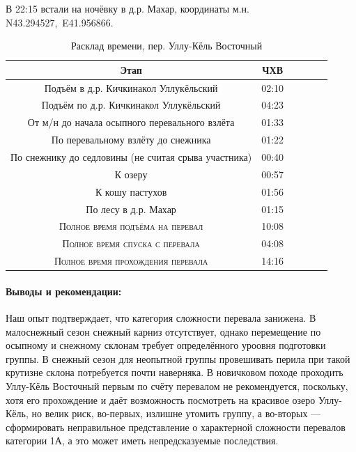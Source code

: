 В 22:15 встали на ночёвку в д.р. Махар, координаты м.н. N43.294527\degree,~E41.956866\degree.

\clearpage 

\begin{table}[h!]
	\centering
	\begin{tabular}{|c|c|c|c|c|c|} 
		\hline 
		Этап & ЧХВ \\ 	
		\hline 
		Подъём в д.р. Кичкинакол Уллукёльский  & 02:10 \\
		Подъём по д.р. Кичкинакол Уллукёльский  & 04:23 \\
		От м/н до начала осыпного перевального взлёта & 01:33\\ 
		По перевальному взлёту до снежника & 01:22\\ 
		По снежнику до седловины (не считая срыва участника) & 00:40\\ 
		К озеру & 00:57 \\
		К кошу пастухов & 01:56 \\
		По лесу в д.р. Махар & 01:15 \\
		\hline
		\textsc{Полное время подъёма на перевал  }& 10:08\\
		\textsc{Полное время спуска с перевала }& 04:08 \\
	\textsc{	Полное время прохождения перевала }& 14:16 \\
		\hline
	\end{tabular}
	\caption{Расклад времени, пер. Уллу-Кёль Восточный}
\end{table}

\paragraph{Выводы и рекомендации:} Наш опыт подтверждает, что категория сложности перевала занижена. В малоснежный сезон снежный карниз отсутствует, однако перемещение по осыпному и снежному склонам требует определённого уроовня подготовки группы. В снежный сезон для неопытной группы провешивать перила при такой крутизне склона потребуется почти наверняка. В новичковом походе проходить Уллу-Кёль Восточный первым по счёту перевалом не рекомендуется, поскольку, хотя его прохождение и даёт возможность посмотреть на красивое озеро Уллу-Кёль, но велик риск, во-первых, излишне утомить группу, а во-вторых --- сформировать неправильное представление о характерной сложности перевалов категории 1А, а это может иметь непредсказуемые последствия. 

\clearpage
